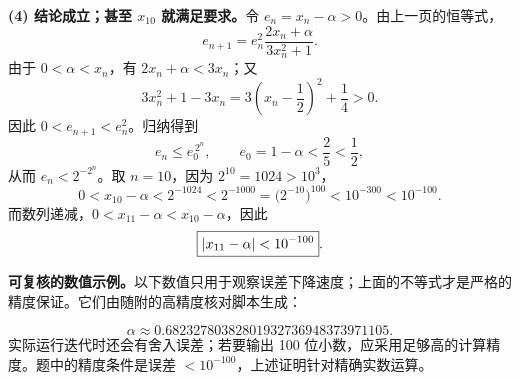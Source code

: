 \newpage
{}
\textbf{(4) 结论成立；甚至 $x_{10}$ 就满足要求。}令 $e_n=x_n-\alpha>0$。由上一页的恒等式，
\[
e_{n+1}=e_n^2\frac{2x_n+\alpha}{3x_n^2+1}.
\]
由于 $0<\alpha<x_n$，有 $2x_n+\alpha<3x_n$；又
\[
3x_n^2+1-3x_n=3\left(x_n-\frac12\right)^2+\frac14>0.
\]
因此 $0<e_{n+1}<e_n^2$。归纳得到
\[
e_n\le e_0^{\,2^n},\qquad e_0=1-\alpha<\frac25<\frac12,
\]
从而 $e_n<2^{-2^n}$。取 $n=10$，因为 $2^{10}=1024>10^3$，
\[
0<x_{10}-\alpha<2^{-1024}<2^{-1000}
=\bigl(2^{-10}\bigr)^{100}<10^{-300}<10^{-100}.
\]
而数列递减，$0<x_{11}-\alpha<x_{10}-\alpha$，因此
\[
\boxed{|x_{11}-\alpha|<10^{-100}}.
\]

\textbf{可复核的数值示例。}以下数值只用于观察误差下降速度；上面的不等式才是严格的精度保证。它们由随附的高精度核对脚本生成：
\begin{center}

\end{center}
\[
\alpha\approx0.68232780382801932736948373971105.
\]
实际运行迭代时还会有舍入误差；若要输出 100 位小数，应采用足够高的计算精度。题中的精度条件是误差 $<10^{-100}$，上述证明针对精确实数运算。

